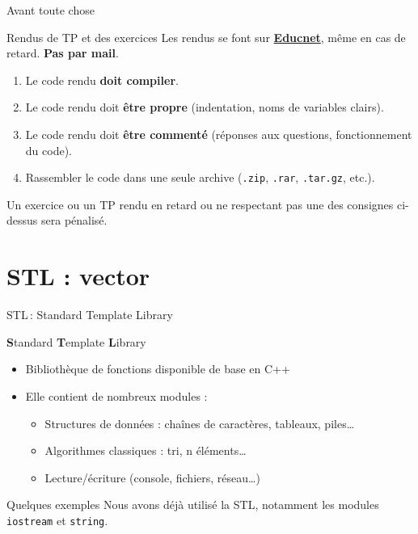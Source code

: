 
\author[nicolas.audebert@onera.fr]{Nicolas Audebert}
\date[8 déc. 2017]{Vendredi 8 décembre 2017}
\subtitle{Vecteurs - Templates}
\maketitle

\begin{frame}{Avant toute chose}
  \begin{alertblock}{Rendus de TP et des exercices}
  Les rendus se font sur \href{https://educnet.enpc.fr}{\textbf{Educnet}}, même en cas de retard. \textbf{Pas par mail}.
  \begin{enumerate}
  	\item Le code rendu \textbf{doit compiler}.
    \item Le code rendu doit \textbf{être propre} (indentation, noms de variables clairs).
    \item Le code rendu doit \textbf{être commenté} (réponses aux questions, fonctionnement du code).
    \item Rassembler le code dans une seule archive (\texttt{.zip}, \texttt{.rar}, \texttt{.tar.gz}, etc.).
  \end{enumerate}
  Un exercice ou un TP rendu en retard ou ne respectant pas une des consignes ci-dessus sera pénalisé.
  \end{alertblock}
\end{frame}

\section{STL : vector}

\begin{frame}{STL\,: Standard Template Library}
    \begin{block}{\textbf{S}tandard \textbf{T}emplate \textbf{L}ibrary}
        \begin{itemize}
            \item Bibliothèque de fonctions disponible de base en C++
            \item Elle contient de nombreux modules :
                \begin{itemize}
                    \item Structures de données : chaînes de caractères, tableaux, piles\dots
                    \item Algorithmes classiques : tri, n éléments\dots
                    \item Lecture/écriture (console, fichiers, réseau\dots)
                \end{itemize}
        \end{itemize}
    \end{block}
    \begin{exampleblock}{Quelques exemples}
    Nous avons déjà utilisé la STL, notamment les modules \texttt{iostream} et \texttt{string}.
    \end{exampleblock}
\end{frame}

